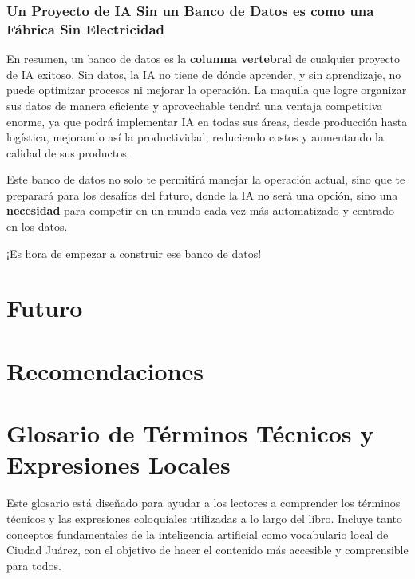 \documentclass[
  10pt,
  letterpaper,
]{book}
\begin{document}
\subsection{Un Proyecto de IA Sin un Banco de Datos es como una Fábrica
Sin
Electricidad}\label{un-proyecto-de-ia-sin-un-banco-de-datos-es-como-una-fuxe1brica-sin-electricidad}

En resumen, un banco de datos es la \textbf{columna vertebral} de
cualquier proyecto de IA exitoso. Sin datos, la IA no tiene de dónde
aprender, y sin aprendizaje, no puede optimizar procesos ni mejorar la
operación. La maquila que logre organizar sus datos de manera eficiente
y aprovechable tendrá una ventaja competitiva enorme, ya que podrá
implementar IA en todas sus áreas, desde producción hasta logística,
mejorando así la productividad, reduciendo costos y aumentando la
calidad de sus productos.

Este banco de datos no solo te permitirá manejar la operación actual,
sino que te preparará para los desafíos del futuro, donde la IA no será
una opción, sino una \textbf{necesidad} para competir en un mundo cada
vez más automatizado y centrado en los datos.

¡Es hora de empezar a construir ese banco de datos!


\chapter{Futuro}\label{futuro}


\chapter{Recomendaciones}\label{recomendaciones}


\chapter{\texorpdfstring{\textbf{Glosario de Términos Técnicos y
Expresiones
Locales}}{Glosario de Términos Técnicos y Expresiones Locales}}\label{glosario-de-tuxe9rminos-tuxe9cnicos-y-expresiones-locales}

Este glosario está diseñado para ayudar a los lectores a comprender los
términos técnicos y las expresiones coloquiales utilizadas a lo largo
del libro. Incluye tanto conceptos fundamentales de la inteligencia
artificial como vocabulario local de Ciudad Juárez, con el objetivo de
hacer el contenido más accesible y comprensible para todos.
\end{document}

